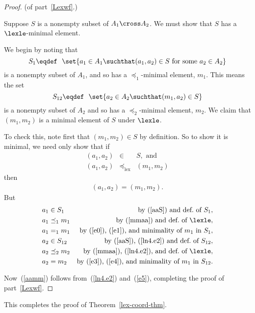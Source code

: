 \begin{proof} (of part~\ref{Lexwf}.)

  Suppose $S$ is a nonempty subset of $A_1 \cross A_2$.  We must show that
  $S$ has a $\lexle$-minimal element.

  We begin by noting that
  \[
  S_1 \eqdef\ \ \set{a_1 \in A_1 \suchthat (a_1,a_2) \in S \mbox{ for some
    } a_2 \in A_2}
  \]
  is a nonempty subset of $A_1$, and so has a $\preceq_1$-minimal element,
  $m_1$.  This means the set
  \[
  S_{12} \eqdef\ \ \set{a_2 \in A_2 \suchthat (m_1,a_2) \in S}
  \]
  is a nonempty subset of $A_2$ and so has a $\preceq_2$-minimal element,
  $m_2$.  We claim that $(m_1,m_2)$ is a minimal element of $S$ under
  $\lexle$.

To check this, note first that $(m_1,m_2) \in S$ by definition.  So to show
it is minimal, we need only show that if
\begin{eqnarray}
(a_1,a_2) & \in & S,\text{ and }\label{aaS}\\
(a_1,a_2) & \preceq_{\text{lex}} & (m_1,m_2)\label{mmaa}
\end{eqnarray}
then
\begin{eqnarray}\label{aamm}
(a_1,a_2) = (m_1,m_2).
\end{eqnarray}
But
\begin{align}
a_1 & \in S_1
       & \text{by~(\ref{aaS}) and def.\ of $S_1$},\label{e0}\\
a_1 & \preceq_1 m_1
       & \text{by~(\ref{mmaa}) and def.\ of $\lexle$},\label{e1}\\
a_1 & =_1 m_1
      &  \text{by~(\ref{e0}),~(\ref{e1}),
               and minimality of $m_1$ in $S_1$},\label{ln4.e2}\\
a_2 & \in S_{12}
        &  \text{by~(\ref{aaS}),~(\ref{ln4.e2}) and def.\ of $S_{12}$},\label{e3}\\
a_2 & \preceq_2 m_2
      & \text{by~(\ref{mmaa}),~(\ref{ln4.e2}), and def.\ of $\lexle$},\label{e4}\\
a_2 & = m_2
      & \text{by~(\ref{e3}),~(\ref{e4}), and minimality of $m_1$ in
       $S_{12}$}. \label{e5}
\end{align}

Now~(\ref{aamm}) follows from~(\ref{ln4.e2}) and~(\ref{e5}), completing
the proof of part~\ref{Lexwf}.
\end{proof}
\fi

This completes the proof of Theorem~\ref{lex-coord-thm}.


